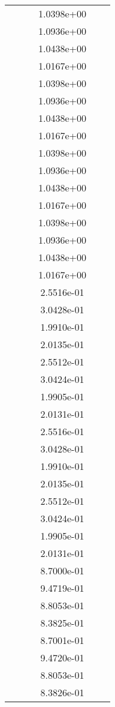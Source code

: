 \begin{xltabular}{\textwidth}{r|rS[table-format=1.3e+2]S[table-format=1.4e+2]S[table-format=1.4e+2]S[table-format=-1.5]}
&  &  & 1.0398e+00 & & \\
&  &  & 1.0936e+00 & & \\
&  &  & 1.0438e+00 & & \\
&  &  & 1.0167e+00 & & \\
&  &  & 1.0398e+00 & & \\
&  &  & 1.0936e+00 & & \\
&  &  & 1.0438e+00 & & \\
&  &  & 1.0167e+00 & & \\
&  &  & 1.0398e+00 & & \\
&  &  & 1.0936e+00 & & \\
&  &  & 1.0438e+00 & & \\
&  &  & 1.0167e+00 & & \\
&  &  & 1.0398e+00 & & \\
&  &  & 1.0936e+00 & & \\
&  &  & 1.0438e+00 & & \\
&  &  & 1.0167e+00 & & \\
&  &  & 2.5516e-01 & & \\
&  &  & 3.0428e-01 & & \\
&  &  & 1.9910e-01 & & \\
&  &  & 2.0135e-01 & & \\
&  &  & 2.5512e-01 & & \\
&  &  & 3.0424e-01 & & \\
&  &  & 1.9905e-01 & & \\
&  &  & 2.0131e-01 & & \\
&  &  & 2.5516e-01 & & \\
&  &  & 3.0428e-01 & & \\
&  &  & 1.9910e-01 & & \\
&  &  & 2.0135e-01 & & \\
&  &  & 2.5512e-01 & & \\
&  &  & 3.0424e-01 & & \\
&  &  & 1.9905e-01 & & \\
&  &  & 2.0131e-01 & & \\
&  &  & 8.7000e-01 & & \\
&  &  & 9.4719e-01 & & \\
&  &  & 8.8053e-01 & & \\
&  &  & 8.3825e-01 & & \\
&  &  & 8.7001e-01 & & \\
&  &  & 9.4720e-01 & & \\
&  &  & 8.8053e-01 & & \\
&  &  & 8.3826e-01 & & \\

\end{xltabular}

